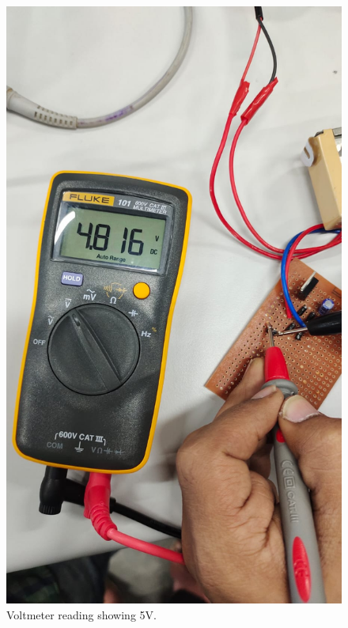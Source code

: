 \documentclass[journal,12pt,twocolumn]{IEEEtran}
\begin{document}
\begin{figure}[!ht]
    \includegraphics[width=\columnwidth]{figs/5V.jpeg}
    \caption{Voltmeter reading showing 5V.}
    \label{fig:filter}
\end{figure}
\end{document}
